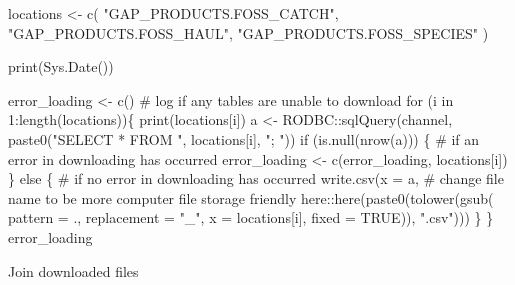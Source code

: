 \documentclass[
  letterpaper,
  oneside,
  open=any]{scrbook}
\newenvironment{Shaded}{\begin{snugshade}}{\end{snugshade}}
\newcommand{\AttributeTok}[1]{\textcolor[rgb]{0.40,0.45,0.13}{#1}}
\newcommand{\CommentTok}[1]{\textcolor[rgb]{0.37,0.37,0.37}{#1}}
\newcommand{\ConstantTok}[1]{\textcolor[rgb]{0.56,0.35,0.01}{#1}}
\newcommand{\ControlFlowTok}[1]{\textcolor[rgb]{0.00,0.23,0.31}{#1}}
\newcommand{\DecValTok}[1]{\textcolor[rgb]{0.68,0.00,0.00}{#1}}
\newcommand{\FunctionTok}[1]{\textcolor[rgb]{0.28,0.35,0.67}{#1}}
\newcommand{\NormalTok}[1]{\textcolor[rgb]{0.00,0.23,0.31}{#1}}
\newcommand{\OtherTok}[1]{\textcolor[rgb]{0.00,0.23,0.31}{#1}}
\newcommand{\SpecialCharTok}[1]{\textcolor[rgb]{0.37,0.37,0.37}{#1}}
\newcommand{\StringTok}[1]{\textcolor[rgb]{0.13,0.47,0.30}{#1}}
\begin{document}
\begin{Shaded}
\begin{Highlighting}[]
\NormalTok{locations }\OtherTok{\textless{}{-}} \FunctionTok{c}\NormalTok{(}
  \StringTok{"GAP\_PRODUCTS.FOSS\_CATCH"}\NormalTok{,}
  \StringTok{"GAP\_PRODUCTS.FOSS\_HAUL"}\NormalTok{,}
  \StringTok{"GAP\_PRODUCTS.FOSS\_SPECIES"}
\NormalTok{)}

\FunctionTok{print}\NormalTok{(}\FunctionTok{Sys.Date}\NormalTok{())}

\NormalTok{error\_loading }\OtherTok{\textless{}{-}} \FunctionTok{c}\NormalTok{() }\CommentTok{\# log if any tables are unable to download }
\ControlFlowTok{for}\NormalTok{ (i }\ControlFlowTok{in} \DecValTok{1}\SpecialCharTok{:}\FunctionTok{length}\NormalTok{(locations))\{}
  \FunctionTok{print}\NormalTok{(locations[i])}
\NormalTok{  a }\OtherTok{\textless{}{-}}\NormalTok{ RODBC}\SpecialCharTok{::}\FunctionTok{sqlQuery}\NormalTok{(channel, }\FunctionTok{paste0}\NormalTok{(}\StringTok{"SELECT * FROM "}\NormalTok{, locations[i], }\StringTok{"; "}\NormalTok{))}
  \ControlFlowTok{if}\NormalTok{ (}\FunctionTok{is.null}\NormalTok{(}\FunctionTok{nrow}\NormalTok{(a))) \{ }\CommentTok{\# if an error in downloading has occurred}
\NormalTok{    error\_loading }\OtherTok{\textless{}{-}} \FunctionTok{c}\NormalTok{(error\_loading, locations[i])}
\NormalTok{  \} }\ControlFlowTok{else}\NormalTok{ \{ }\CommentTok{\# if no error in downloading has occurred}
    \FunctionTok{write.csv}\NormalTok{(}\AttributeTok{x =}\NormalTok{ a, }
              \CommentTok{\# change file name to be more computer file storage friendly}
\NormalTok{              here}\SpecialCharTok{::}\FunctionTok{here}\NormalTok{(}\FunctionTok{paste0}\NormalTok{(}\FunctionTok{tolower}\NormalTok{(}\FunctionTok{gsub}\NormalTok{(}
                \AttributeTok{pattern =} \StringTok{\textquotesingle{}.\textquotesingle{}}\NormalTok{, }
                \AttributeTok{replacement =} \StringTok{"\_"}\NormalTok{, }
                \AttributeTok{x =}\NormalTok{ locations[i], }
                \AttributeTok{fixed =} \ConstantTok{TRUE}\NormalTok{)),}
                \StringTok{".csv"}\NormalTok{)))}
\NormalTok{  \}}
\NormalTok{\}}
\NormalTok{error\_loading}
\end{Highlighting}
\end{Shaded}

Join downloaded files
\end{document}
